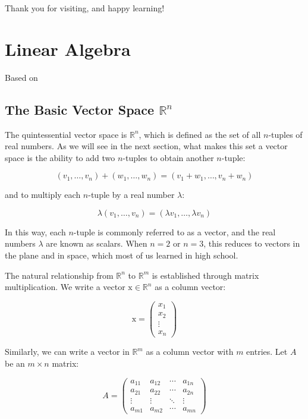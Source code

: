 \documentclass[
]{book}
\theoremstyle{definition}
\theoremstyle{definition}
\theoremstyle{definition}
\theoremstyle{definition}
\theoremstyle{remark}
\begin{document}
Thank you for visiting, and happy learning!

\hypertarget{linear-algebra}{%
\chapter{Linear Algebra}\label{linear-algebra}}

Based on \citet{garrity_2007}

\hypertarget{the-basic-vector-space-mathbbrn}{%
\section{\texorpdfstring{The Basic Vector Space \(\mathbb{R}^n\)}{The Basic Vector Space \textbackslash mathbb\{R\}\^{}n}}\label{the-basic-vector-space-mathbbrn}}

The quintessential vector space is \(\mathbb{R}^n\), which is defined as the set of all \(n\)-tuples of real numbers. As we will see in the next section, what makes this set a vector space is the ability to add two \(n\)-tuples to obtain another \(n\)-tuple:

\[
(v_1, \ldots, v_n) + (w_1, \ldots, w_n) = (v_1 + w_1, \ldots, v_n + w_n)
\]

and to multiply each \(n\)-tuple by a real number \(\lambda\):

\[
\lambda (v_1, \ldots, v_n) = (\lambda v_1, \ldots, \lambda v_n)
\]

In this way, each \(n\)-tuple is commonly referred to as a vector, and the real numbers \(\lambda\) are known as scalars. When \(n = 2\) or \(n = 3\), this reduces to vectors in the plane and in space, which most of us learned in high school.

The natural relationship from \(\mathbb{R}^n\) to \(\mathbb{R}^m\) is established through matrix multiplication. We write a vector \(\mathrm{x} \in \mathbb{R}^n\) as a column vector:

\[
\mathrm{x} = \begin{pmatrix} x_1 \\ x_2 \\ \vdots \\ x_n \end{pmatrix}
\]

Similarly, we can write a vector in \(\mathbb{R}^m\) as a column vector with \(m\) entries. Let \(A\) be an \(m \times n\) matrix:

\[
A = \begin{pmatrix}
a_{11} & a_{12} & \cdots & a_{1n} \\
a_{21} & a_{22} & \cdots & a_{2n} \\
\vdots & \vdots & \ddots & \vdots \\
a_{m1} & a_{m2} & \cdots & a_{mn}
\end{pmatrix}
\]
\end{document}

